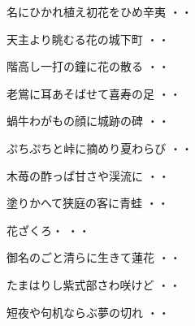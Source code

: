 \begin{shiika}名にひかれ植え初花をひめ辛夷
\hfill{・・}\end{shiika}
\vspace{0.6cm}
\begin{shiika}天主より眺むる花の城下町
\hfill{・・}\end{shiika}
\vspace{0.6cm}
\begin{shiika}階高し一打の鐘に花の散る
\hfill{・・}\end{shiika}
\vspace{0.6cm}
\begin{shiika}老鴬に耳あそばせて喜寿の足
\hfill{・・}\end{shiika}
\vspace{0.6cm}
\begin{shiika}蝸牛わがもの顔に城跡の碑
\hfill{・・}\end{shiika}
\vspace{0.6cm}
\begin{shiika}ぷちぷちと峠に摘めり夏わらび
\hfill{・・}\end{shiika}
\vspace{0.6cm}
\begin{shiika}木苺の酢っぱ甘さや渓流に
\hfill{・・}\end{shiika}
\vspace{0.6cm}
\begin{shiika}塗りかへて狭庭の客に青蛙
\hfill{・・}\end{shiika}
\vspace{0.6cm}
\begin{shiika}花ざくろ・
\hfill{・・}\end{shiika}
\vspace{0.6cm}
\begin{shiika}御名のごと清らに生きて蓮花
\hfill{・・}\end{shiika}
\vspace{0.6cm}
\begin{shiika}たまはりし紫式部さわ咲けど
\hfill{・・}\end{shiika}
\vspace{0.6cm}
\begin{shiika}短夜や句机ならぶ夢の切れ
\hfill{・・}\end{shiika}
